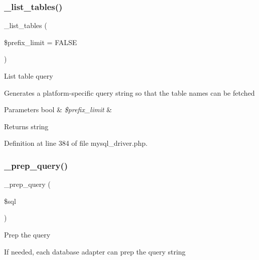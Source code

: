 \mbox{\label{class_c_i___d_b__mysql__driver_a435c0f3ce54fe7daa178baa8532ebd54}} 
\subsubsection{\texorpdfstring{\_list\_tables()}{\_list\_tables()}}
{\footnotesize\ttfamily \+\_\+list\+\_\+tables (\begin{DoxyParamCaption}\item[{}]{\$prefix\+\_\+limit = {\ttfamily FALSE} }\end{DoxyParamCaption})\hspace{0.3cm}{\ttfamily [protected]}}

List table query

Generates a platform-\/specific query string so that the table names can be fetched


\begin{DoxyParams}[1]{Parameters}
bool & {\em \$prefix\+\_\+limit} & \\
\hline
\end{DoxyParams}
\begin{DoxyReturn}{Returns}
string 
\end{DoxyReturn}


Definition at line 384 of file mysql\+\_\+driver.\+php.

\mbox{\label{class_c_i___d_b__mysql__driver_a86af88ef0fa6d44ab4691e3f53270339}} 
\subsubsection{\texorpdfstring{\_prep\_query()}{\_prep\_query()}}
{\footnotesize\ttfamily \+\_\+prep\+\_\+query (\begin{DoxyParamCaption}\item[{}]{\$sql }\end{DoxyParamCaption})\hspace{0.3cm}{\ttfamily [protected]}}

Prep the query

If needed, each database adapter can prep the query string


